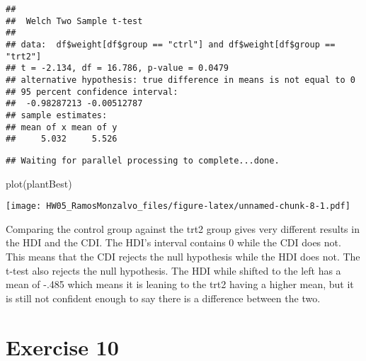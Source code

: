 \documentclass[
]{article}
\newenvironment{Shaded}{\begin{snugshade}}{\end{snugshade}}
\newcommand{\FunctionTok}[1]{\textcolor[rgb]{0.00,0.00,0.00}{#1}}
\newcommand{\NormalTok}[1]{#1}
\newcommand{\OtherTok}[1]{\textcolor[rgb]{0.56,0.35,0.01}{#1}}
\newcommand{\SpecialCharTok}[1]{\textcolor[rgb]{0.00,0.00,0.00}{#1}}
\newcommand{\StringTok}[1]{\textcolor[rgb]{0.31,0.60,0.02}{#1}}
\begin{document}
\begin{verbatim}
## 
##  Welch Two Sample t-test
## 
## data:  df$weight[df$group == "ctrl"] and df$weight[df$group == "trt2"]
## t = -2.134, df = 16.786, p-value = 0.0479
## alternative hypothesis: true difference in means is not equal to 0
## 95 percent confidence interval:
##  -0.98287213 -0.00512787
## sample estimates:
## mean of x mean of y 
##     5.032     5.526
\end{verbatim}

\begin{Shaded}
\end{Shaded}

\begin{verbatim}
## Waiting for parallel processing to complete...done.
\end{verbatim}

\begin{Shaded}
\begin{Highlighting}[]
\FunctionTok{plot}\NormalTok{(plantBest)}
\end{Highlighting}
\end{Shaded}

\texttt{[image: HW05\_RamosMonzalvo\_files/figure-latex/unnamed-chunk-8-1.pdf]}

Comparing the control group against the trt2 group gives very different
results in the HDI and the CDI. The HDI's interval contains 0 while the
CDI does not. This means that the CDI rejects the null hypothesis while
the HDI does not. The t-test also rejects the null hypothesis. The HDI
while shifted to the left has a mean of -.485 which means it is leaning
to the trt2 having a higher mean, but it is still not confident enough
to say there is a difference between the two.

\hypertarget{exercise-10}{%
\section{Exercise 10}\label{exercise-10}}
\end{document}
